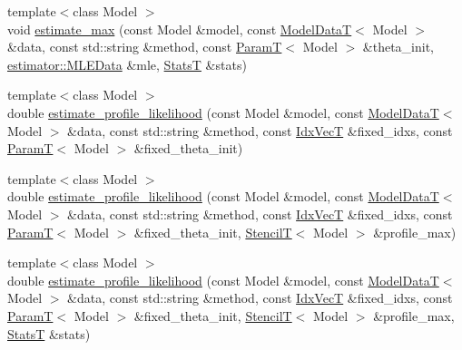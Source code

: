 \begin{DoxyCompactItemize}
\item 
{\footnotesize template$<$class Model $>$ }\\void \hyperlink{namespacemappel_1_1methods_adef3997d9422e83ffbe334f26bb819a7}{estimate\+\_\+max} (const Model \&model, const \hyperlink{namespacemappel_a97f050df953605381ae9c901c3b125f1}{Model\+DataT}$<$ Model $>$ \&data, const std\+::string \&method, const \hyperlink{namespacemappel_a667925cb0d6c0e49f2f035cc5a9a6857}{ParamT}$<$ Model $>$ \&theta\+\_\+init, \hyperlink{namespacemappel_1_1estimator_structmappel_1_1estimator_1_1MLEData}{estimator\+::\+M\+L\+E\+Data} \&mle, \hyperlink{namespacemappel_a04ab395b0cf82c4ce68a36b2212649a5}{StatsT} \&stats)
\item 
{\footnotesize template$<$class Model $>$ }\\double \hyperlink{namespacemappel_1_1methods_a513903ddb809d73c9430673c479f386e}{estimate\+\_\+profile\+\_\+likelihood} (const Model \&model, const \hyperlink{namespacemappel_a97f050df953605381ae9c901c3b125f1}{Model\+DataT}$<$ Model $>$ \&data, const std\+::string \&method, const \hyperlink{namespacemappel_ac63743dcd42180127307cd0e4ecdd784}{Idx\+VecT} \&fixed\+\_\+idxs, const \hyperlink{namespacemappel_a667925cb0d6c0e49f2f035cc5a9a6857}{ParamT}$<$ Model $>$ \&fixed\+\_\+theta\+\_\+init)
\item 
{\footnotesize template$<$class Model $>$ }\\double \hyperlink{namespacemappel_1_1methods_a2ded1909eaa564c96ca2bb0982655673}{estimate\+\_\+profile\+\_\+likelihood} (const Model \&model, const \hyperlink{namespacemappel_a97f050df953605381ae9c901c3b125f1}{Model\+DataT}$<$ Model $>$ \&data, const std\+::string \&method, const \hyperlink{namespacemappel_ac63743dcd42180127307cd0e4ecdd784}{Idx\+VecT} \&fixed\+\_\+idxs, const \hyperlink{namespacemappel_a667925cb0d6c0e49f2f035cc5a9a6857}{ParamT}$<$ Model $>$ \&fixed\+\_\+theta\+\_\+init, \hyperlink{namespacemappel_a3a06598240007876f8c4bf834ad86197}{StencilT}$<$ Model $>$ \&profile\+\_\+max)
\item 
{\footnotesize template$<$class Model $>$ }\\double \hyperlink{namespacemappel_1_1methods_ac4b84c09a4d0e693d9c787c0e567f894}{estimate\+\_\+profile\+\_\+likelihood} (const Model \&model, const \hyperlink{namespacemappel_a97f050df953605381ae9c901c3b125f1}{Model\+DataT}$<$ Model $>$ \&data, const std\+::string \&method, const \hyperlink{namespacemappel_ac63743dcd42180127307cd0e4ecdd784}{Idx\+VecT} \&fixed\+\_\+idxs, const \hyperlink{namespacemappel_a667925cb0d6c0e49f2f035cc5a9a6857}{ParamT}$<$ Model $>$ \&fixed\+\_\+theta\+\_\+init, \hyperlink{namespacemappel_a3a06598240007876f8c4bf834ad86197}{StencilT}$<$ Model $>$ \&profile\+\_\+max, \hyperlink{namespacemappel_a04ab395b0cf82c4ce68a36b2212649a5}{StatsT} \&stats)

\end{DoxyCompactItemize}
